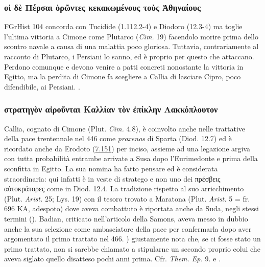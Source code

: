 {            \subsubsection{\textgreek{οἱ δὲ Πέρσαι ὁρῶντες κεκακωμένους τοὺς Ἀθηναίους}}
            FGrHist 104 concorda con Tucidide (1.112.2-4) e  Diodoro (12.3-4) ma toglie l'ultima vittoria a  Cimone come Plutarco (\emph{Cim.} 19) facendolo morire prima dello scontro navale a causa di una malattia poco gloriosa. Tuttavia, contrariamente al racconto di Plutarco, i Persiani lo sanno, ed è proprio per questo che attaccano. Perdono comunque e devono venire a patti concreti nonostante la vittoria in Egitto, ma la perdita di  Cimone fa scegliere a Callia di lasciare Cipro, poco difendibile, ai Persiani. \cite[182 n. 17]{Green2006}.
            \subsubsection{\textgreek{στρατηγὸν αἱροῦνται Καλλίαν τὸν ἐπίκλην Λακκόπλουτον}}
            Callia, cognato di  Cimone (Plut. \emph{Cim.} 4.8), è coinvolto anche nelle trattative della pace trentennale nel 446 come \emph{proxenos} di Sparta (Diod. 12.7) ed è ricordato anche da Erodoto (\href{http://data.perseus.org/citations/urn:cts:greekLit:tlg0016.tlg001.perseus-grc1:7.151}{7.151}) per inciso, assieme ad una legazione argiva con tutta probabilità entrambe arrivate a Susa dopo l'Eurimedonte e prima della sconfitta in Egitto. La sua nomina ha fatto pensare ed è considerata straordinaria: qui infatti è in veste di stratego e non uno dei \textgreek{πρέσβεις αὐτοκράτορες} come in Diod. 12.4. La tradizione rispetto al suo arricchimento (Plut. \emph{Arist. }25; Lys. 19) con il tesoro trovato a Maratona (Plut. \emph{Arist. }5 = fr. 696 KA, adespoto) dove aveva combattuto è riportata anche da Suda, negli stessi termini  (\cite[132]{Samons1998}). Badian, criticato nell'articolo della Samons, aveva messo in dubbio anche la sua selezione come ambasciatore della pace per confermarla dopo aver argomentato il primo trattato nel 466. \cite[139]{Samons1998}) giustamente nota che, se ci fosse stato un primo trattato, non si sarebbe chiamato a stipularne un secondo proprio colui che aveva siglato quello disatteso pochi anni prima. Cfr. \emph{Them. Ep.}  9. e \cite[164-6]{CulassoGastaldi1990}. 
}
